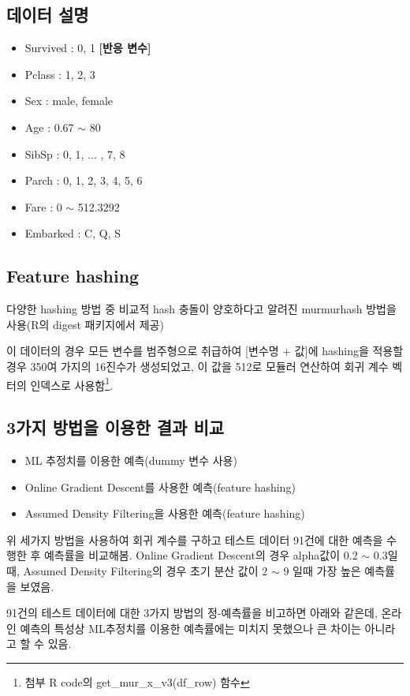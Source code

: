 \documentclass[oneside,b5paper,11pt]{article} %
\begin{document}
\subsection{데이터 설명}
\begin{itemize}
	\item Survived : 0, 1 \textbf{[반응 변수]}
	\item Pclass : 1, 2, 3
	\item Sex : male, female
	\item Age : 0.67 $\sim$ 80
	\item SibSp : 0, 1, ... , 7, 8
	\item Parch : 0, 1, 2, 3, 4, 5, 6
	\item Fare : 0 $\sim$ 512.3292
	\item Embarked : C, Q, S
\end{itemize}

\subsection{Feature hashing}
 다양한 hashing 방법 중 비교적 hash 충돌이 양호하다고 알려진 murmurhash 방법을 사용(R의 digest 패키지에서 제공)

 이 데이터의 경우 모든 변수를 범주형으로 취급하여 [변수명 + 값]에 hashing을 적용할 경우 350여 가지의 16진수가 생성되었고, 이 값을 512로 모듈러 연산하여 회귀 계수 벡터의 인덱스로 사용함\footnote{첨부 R code의 get\_mur\_x\_v3(df\_row) 함수}.
 

\subsection{3가지 방법을 이용한 결과 비교}
\begin{itemize}
	\item ML 추정치를 이용한 예측(dummy 변수 사용)
	\item Online Gradient Descent를 사용한 예측(feature hashing)
	\item Assumed Density Filtering을 사용한 예측(feature hashing)
\end{itemize}

위 세가지 방법을 사용하여 회귀 계수를 구하고 테스트 데이터 91건에 대한 예측을 수행한 후 예측률을 비교해봄.
 Online Gradient Descent의 경우 alpha값이 0.2 $\sim$ 0.3일때, Assumed Density Filtering의 경우 초기 분산 값이 2 $\sim$ 9 일때 가장 높은 예측률을 보였음.


 91건의 테스트 데이터에 대한 3가지 방법의 정-예측률을 비고하면 아래와 같은데, 온라인 예측의 특성상 ML추정치를 이용한 예측률에는 미치지 못했으나 큰 차이는 아니라고 할 수 있음.
\end{document}
